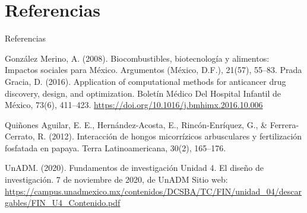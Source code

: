 \documentclass[10pt]{beamer}
\begin{document}
\section{Referencias}
\begin{frame}{Referencias}
	\begin{thebibliography}{X}
		 González Merino, A. (2008). Biocombustibles, biotecnología y alimentos: Impactos sociales para México. Argumentos (México, D.F.), 21(57), 55–83.
		 Prada Gracia, D. (2016). Application of computational methods for anticancer drug discovery, design, and optimization. Boletín Médico Del Hospital Infantil de México, 73(6), 411–423. \url{https://doi.org/10.1016/j.bmhimx.2016.10.006}
		
		 Quiñones Aguilar, E. E., Hernández-Acosta, E., Rincón-Enríquez, G., \& Ferrera-Cerrato, R. (2012). Interacción de hongos micorrízicos arbusculares y fertilización fosfatada en papaya. Terra Latinoamericana, 30(2), 165–176.
		
		 UnADM. (2020). Fundamentos de investigación Unidad 4. El diseño de investigación. 7 de noviembre de 2020, de UnADM Sitio web: \url{https://campus.unadmexico.mx/contenidos/DCSBA/TC/FIN/unidad_04/descargables/FIN_U4_Contenido.pdf}
	\end{thebibliography}
\end{frame}
\end{document}
